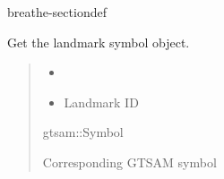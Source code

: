 \documentclass[letterpaper,10pt,english]{sphinxmanual}
\begin{document}
\begin{fulllineitems}
\begin{sphinxuseclass}{breathe-sectiondef}
\begin{fulllineitems}
\label{\detokenize{isam2:_CPPv4N4slam14SLAMEstAndMCov19get_landmark_symbolEi}}\label{\detokenize{isam2:_CPPv3N4slam14SLAMEstAndMCov19get_landmark_symbolEi}}\label{\detokenize{isam2:_CPPv2N4slam14SLAMEstAndMCov19get_landmark_symbolEi}}\label{\detokenize{isam2:slam::SLAMEstAndMCov::get_landmark_symbol__i}}
\pysigstartsignatures
\pysigstartmultiline
\pysiglinewithargsret
{\label{\detokenize{isam2:classslam_1_1SLAMEstAndMCov_1a493e5cde8f32c6a4c38f4aadfd023a85}}}
{}
{}
\pysigstopmultiline
\pysigstopsignatures
\sphinxAtStartPar
Get the landmark symbol object. 
\begin{quote}\begin{description}
\begin{itemize}
\item {} 
\sphinxAtStartPar
{} \textendash{} 

\item {} 
\sphinxAtStartPar
{} \textendash{} Landmark ID 

\end{itemize}

\sphinxAtStartPar
gtsam::Symbol

\sphinxAtStartPar
Corresponding GTSAM symbol 

\end{description}\end{quote}

\end{fulllineitems}


\end{sphinxuseclass}
\end{fulllineitems}


\sphinxstepscope
\end{document}
